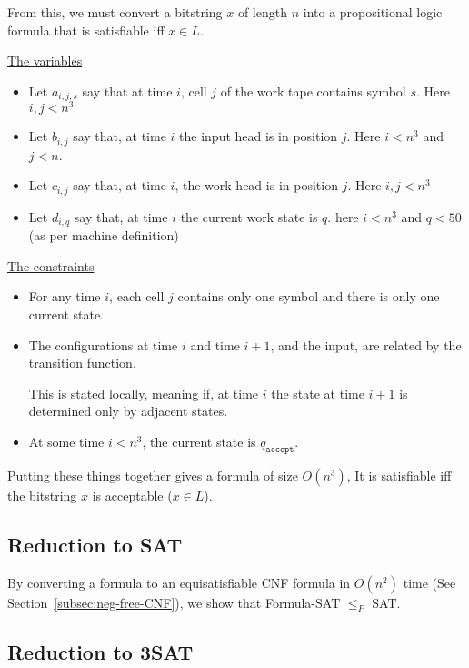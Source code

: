 \documentclass{article}
\begin{document}
From this, we must convert a bitstring $x$ of length $n$ into a propositional logic formula that is satisfiable iff $x\in L$.

\underline{The variables}
\begin{itemize}
  \item Let $a_{i,j,s}$ say that at time $i$, cell $j$ of the work tape contains symbol $s$. Here $i,j < n^{3}$
  \item Let $b_{i,j}$ say that, at time $i$ the input head is in position $j$. Here $i < n^{3}$ and $j < n$.
  \item Let $c_{i,j}$ say that, at time $i$, the work head is in position $j$. Here $i,j < n^{3}$
  \item Let $d_{i,q}$ say that, at time $i$ the current work state is $q$. here $i < n^{3}$ and $q < 50$ (as per machine definition)
\end{itemize}

\underline{The constraints}

\begin{itemize}
  \item For any time $i$, each cell $j$ contains only one symbol and there is only one current state.
  \item The configurations at time $i$ and time $i+1$, and the input, are related by the transition function.

        This is stated locally, meaning if, at time $i$ the state at time $i+1$ is determined only by adjacent states.
  \item At some time $i < n^{3}$, the current state is $q_{\texttt{accept} }$.
\end{itemize}

Putting these things together gives a formula of size $O(n^{3})$, It is satisfiable iff the bitstring $x$ is acceptable ($x \in L$).

\subsection{Reduction to SAT}
\label{subsec:red-sat}

By converting a formula to an equisatisfiable CNF formula in $O(n^{2})$ time (See Section~\ref{subsec:neg-free-CNF}), we show that Formula-SAT $\leq_{P}$ SAT.

\subsection{Reduction to 3SAT}
\label{subsec:red-3sat}
\end{document}
